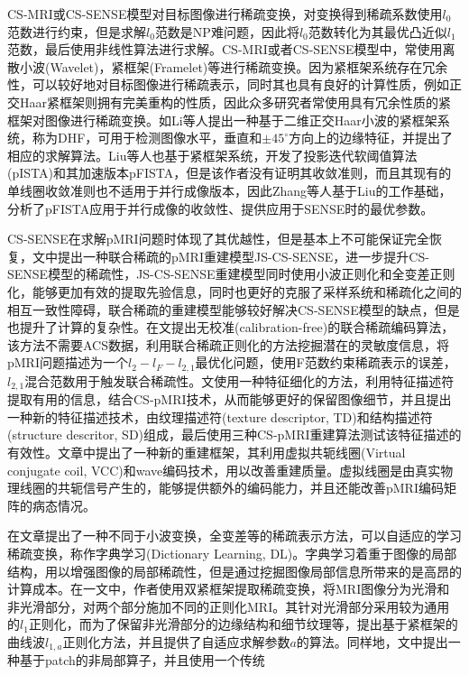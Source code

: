 \documentclass[UTF8]{article}
\begin{document}
\par CS-MRI或CS-SENSE模型对目标图像进行稀疏变换，对变换得到稀疏系数使用$l_0$范数进行约束，但是求解$l_0$范数是NP难问题，因此将$l_0$范数转化为其最优凸近似$l_1$范数，最后使用非线性算法进行求解。CS-MRI或者CS-SENSE模型中，常使用离散小波(Wavelet)，紧框架(Framelet)等进行稀疏变换。因为紧框架系统存在冗余性，可以较好地对目标图像进行稀疏表示，同时其也具有良好的计算性质，例如正交Haar紧框架则拥有完美重构的性质，因此众多研究者常使用具有冗余性质的紧框架对图像进行稀疏变换。如Li等人提出一种基于二维正交Haar小波的紧框架系统，称为DHF\cite{li2016adaptive}，可用于检测图像水平，垂直和$\pm 45^{\circ}$方向上的边缘特征，并提出了相应的求解算法。Liu等人也基于紧框架系统，开发了投影迭代软阈值算法(pISTA)\cite{7448403}和其加速版本pFISTA，但是该作者没有证明其收敛准则，而且其现有的单线圈收敛准则也不适用于并行成像版本，因此Zhang等人\cite{ZHANG2021101987}基于Liu的工作基础，分析了pFISTA应用于并行成像的收敛性、提供应用于SENSE时的最优参数。
\par CS-SENSE在求解pMRI问题时体现了其优越性，但是基本上不可能保证完全恢复，文\cite{chun2015efficient}中提出一种联合稀疏的pMRI重建模型JS-CS-SENSE，进一步提升CS-SENSE模型的稀疏性，JS-CS-SENSE重建模型同时使用小波正则化和全变差正则化，能够更加有效的提取先验信息，同时也更好的克服了采样系统和稀疏化之间的相互一致性障碍，联合稀疏的重建模型能够较好解决CS-SENSE模型的缺点，但是也提升了计算的复杂性。在文\cite{wang2017learning}提出无校准(calibration-free)的联合稀疏编码算法，该方法不需要ACS数据，利用联合稀疏正则化的方法挖掘潜在的灵敏度信息，将pMRI问题描述为一个$l_2-l_F-l_{2,1}$最优化问题，使用F范数约束稀疏表示的误差，$l_{2,1}$混合范数用于触发联合稀疏性。文\cite{cheng2018improved}使用一种特征细化的方法，利用特征描述符提取有用的信息，结合CS-pMRI技术，从而能够更好的保留图像细节，并且提出一种新的特征描述技术，由纹理描述符(texture descriptor, TD)和结构描述符(structure descritor, SD)组成，最后使用三种CS-pMRI重建算法测试该特征描述的有效性。文章\cite{qiu2021highly}中提出了一种新的重建框架，其利用虚拟共轭线圈(Virtual conjugate coil, VCC)\cite{blaimer2009virtual}和wave编码技术，用以改善重建质量。虚拟线圈是由真实物理线圈的共轭信号产生的，能够提供额外的编码能力，并且还能改善pMRI编码矩阵的病态情况。
\par 在文章\cite{ravishankar2010mr}提出了一种不同于小波变换，全变差等的稀疏表示方法，可以自适应的学习稀疏变换，称作字典学习(Dictionary Learning, DL)。字典学习着重于图像的局部结构，用以增强图像的局部稀疏性，但是通过挖掘图像局部信息所带来的是高昂的计算成本。在\cite{chen2020new}一文中，作者使用双紧框架提取稀疏变换，将MRI图像分为光滑和非光滑部分，对两个部分施加不同的正则化MRI。其针对光滑部分采用较为通用的$l_{1}$正则化，而为了保留非光滑部分的边缘结构和细节纹理等，提出基于紧框架的曲线波$l_{1,a}$正则化方法，并且提供了自适应求解参数$a$的算法。同样地，文\cite{qu2014magnetic}中提出一种基于patch的非局部算子，并且使用一个传统
\end{document}
